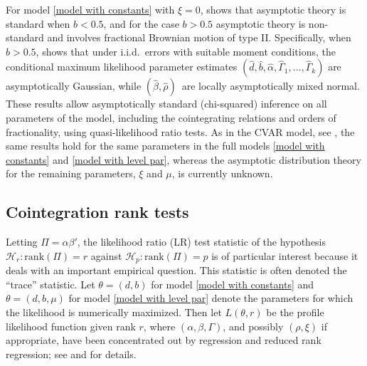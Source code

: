 \documentclass[article]{jss}
\begin{document}
For model \eqref{model with constants} with $\xi=0$, \cite{johansen2012likelihood} shows that asymptotic theory is standard when $b<0.5$, and for the case $b>0.5$ asymptotic theory is non-standard and involves fractional Brownian motion of type II. Specifically, when $b>0.5$, \cite{johansen2012likelihood} shows that under i.i.d.\ errors with suitable moment conditions, the conditional maximum likelihood parameter estimates  $(\hat{d},\hat{b},\hat{\alpha},\hat{\Gamma}_{1},\ldots,\hat{\Gamma}_{k})$ are asymptotically Gaussian, while $(\hat{\beta},\hat{\rho})$\ are locally asymptotically mixed normal. These results allow asymptotically standard (chi-squared) inference on all parameters of the model, including the cointegrating relations and orders of fractionality, using quasi-likelihood ratio tests. As in the CVAR model, see \cite{Johansen1995}, the same results hold for the same parameters in the full models \eqref{model with constants} and \eqref{model with level par}, whereas the asymptotic distribution theory for the remaining parameters, $\xi$ and $\mu$, is currently unknown.


\subsection{Cointegration rank tests}

Letting $\Pi = \alpha \beta'$, the likelihood ratio (LR) test statistic of the hypothesis $\mathcal{H}_{r}: \mathrm{rank}(\Pi )=r$ against $\mathcal{H}_{p}:\mathrm{rank}(\Pi )=p$ is of particular interest because it deals with an important empirical question. This statistic is often denoted the ``trace'' statistic. Let $\theta = (d,b)$ for model \eqref{model with constants} and $\theta = (d,b,\mu)$ for model \eqref{model with level par} denote the parameters for which the likelihood is numerically maximized. Then let $L(\theta,r)$ be the profile likelihood function given rank $r$, where $(\alpha ,\beta ,\Gamma )$, and possibly $(\rho,\xi)$ if appropriate, have been concentrated out by regression and reduced rank regression; see \cite{johansen2012likelihood} and \cite{Dolatabadi2014} for details.
\end{document}
